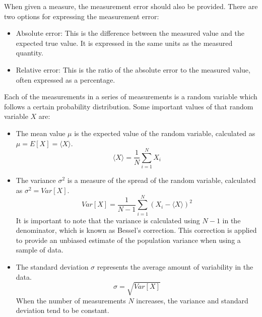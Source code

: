 When given a measure, the measurement error should also be provided. There are two options for expressing the measurement error:
\begin{itemize}
    \item Absolute error: This is the difference between the measured value and the expected true value. It is expressed in the same units as the measured quantity.
    \item Relative error: This is the ratio of the absolute error to the measured value, often expressed as a percentage.
\end{itemize}

Each of the measurements in a series of measurements is a random variable which follows a certain probability distribution. Some important values of that random variable $X$ are:
\begin{itemize}
    \item The mean value $\mu$ is the expected value of the random variable, calculated as $\mu = E[X] =\langle X \rangle$.
    \begin{equation*}
        \langle X \rangle = \dfrac{1}{N}\sum_{i=1}^N X_i
    \end{equation*}
    \item The variance $\sigma^2$ is a measure of the spread of the random variable, calculated as $\sigma^2 = Var[X]$.
    \begin{equation*}
        Var[X] = \dfrac{1}{N-1}\sum_{i=1}^N (X_i - \langle X \rangle)^2
    \end{equation*}
    It is important to note that the variance is calculated using $N-1$ in the denominator, which is known as Bessel's correction. This correction is applied to provide an unbiased estimate of the population variance when using a sample of data.
    \item The standard deviation $\sigma$ represents the average amount of variability in the data.
    \begin{equation*}
        \sigma = \sqrt{Var[X]}
    \end{equation*}
    When the number of measurements $N$ increases, the variance and standard deviation tend to be constant.


\end{itemize}
